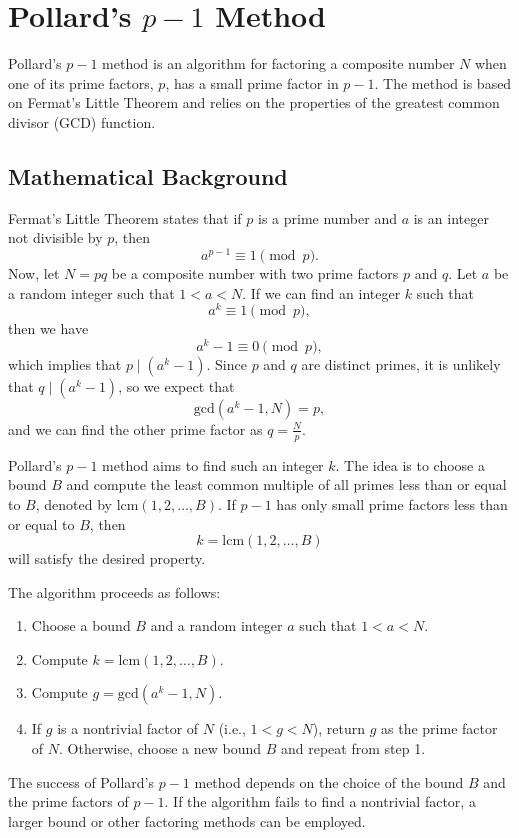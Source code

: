 \documentclass[12pt,openany]{book}
\begin{document}
	\section*{Pollard's $p-1$ Method}
	Pollard's $p-1$ method is an algorithm for factoring a composite number $N$ when one of its prime factors, $p$, has a small prime factor in $p-1$. The method is based on Fermat's Little Theorem and relies on the properties of the greatest common divisor (GCD) function.
	
	\subsection*{Mathematical Background}
	Fermat's Little Theorem states that if $p$ is a prime number and $a$ is an integer not divisible by $p$, then
	\[
	a^{p-1} \equiv 1 \pmod{p}.
	\]
	Now, let $N = pq$ be a composite number with two prime factors $p$ and $q$. Let $a$ be a random integer such that $1 < a < N$. If we can find an integer $k$ such that
	\[
	a^k \equiv 1 \pmod{p},
	\]
	then we have
	\[
	a^k - 1 \equiv 0 \pmod{p},
	\]
	which implies that $p \mid (a^k - 1)$. Since $p$ and $q$ are distinct primes, it is unlikely that $q \mid (a^k - 1)$, so we expect that
	\[
	\text{gcd}(a^k - 1, N) = p,
	\]
	and we can find the other prime factor as $q = \frac{N}{p}$.
	
	Pollard's $p-1$ method aims to find such an integer $k$. The idea is to choose a bound $B$ and compute the least common multiple of all primes less than or equal to $B$, denoted by $\text{lcm}(1, 2, \ldots, B)$. If $p-1$ has only small prime factors less than or equal to $B$, then
	\[
	k = \text{lcm}(1, 2, \ldots, B)
	\]
	will satisfy the desired property.
	
	The algorithm proceeds as follows:
	
	\begin{enumerate}
		\item Choose a bound $B$ and a random integer $a$ such that $1 < a < N$.
		\item Compute $k = \text{lcm}(1, 2, \ldots, B)$.
		\item Compute $g = \text{gcd}(a^k - 1, N)$.
		\item If $g$ is a nontrivial factor of $N$ (i.e., $1 < g < N$), return $g$ as the prime factor of $N$. Otherwise, choose a new bound $B$ and repeat from step 1.
	\end{enumerate}
	
	The success of Pollard's $p-1$ method depends on the choice of the bound $B$ and the prime factors of $p-1$. If the algorithm fails to find a nontrivial factor, a larger bound or other factoring methods can be employed.
	
\end{document}
